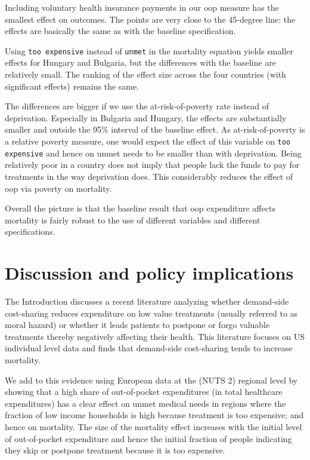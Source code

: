 \documentclass[a4paper,12pt]{article}
\begin{document}
Including voluntary health insurance payments in our oop measure has the smallest effect on outcomes. The points are very close to the 45-degree line: the effects are basically the same as with the baseline specification.

Using \texttt{too expensive} instead of \texttt{unmet} in the mortality equation yields smaller effects for Hungary and Bulgaria, but the differences with the baseline are relatively small. The ranking of the effect size across the four countries (with significant effects) remains the same.

The differences are bigger if we use the at-risk-of-poverty rate instead of deprivation. Especially in Bulgaria and Hungary, the effects are substantially smaller and outside the 95\% interval of the baseline effect. As at-risk-of-poverty is a relative poverty measure, one would expect the effect of this variable on \texttt{too expensive} and hence on unmet needs to be smaller than with deprivation. Being relatively poor in a country does not imply that people lack the funds to pay for treatments in the way deprivation does. This considerably reduces the effect of oop via poverty on mortality.

Overall the picture is that the baseline result that oop expenditure affects mortality is fairly robust to the use of different variables and different specifications. 


\section{Discussion and policy implications}
\label{sec:org560cb8f}

The Introduction discusses a recent literature analyzing whether demand-side cost-sharing reduces expenditure on low value treatments (usually referred to as moral hazard) or whether it leads patients to postpone or forgo valuable treatments thereby negatively affecting their health. This literature focuses on US individual level data and finds that demand-side cost-sharing tends to increase mortality.

We add to this evidence using European data at the (NUTS 2) regional level by showing that a high share of out-of-pocket expenditures (in total healthcare expenditures) has a clear effect on unmet medical needs in regions where the fraction of low income households is high because treatment is too expensive; and hence on mortality. The size of the mortality effect increases with the initial level of out-of-pocket expenditure and hence the initial fraction of people indicating they skip or postpone treatment because it is too expensive.
\end{document}
